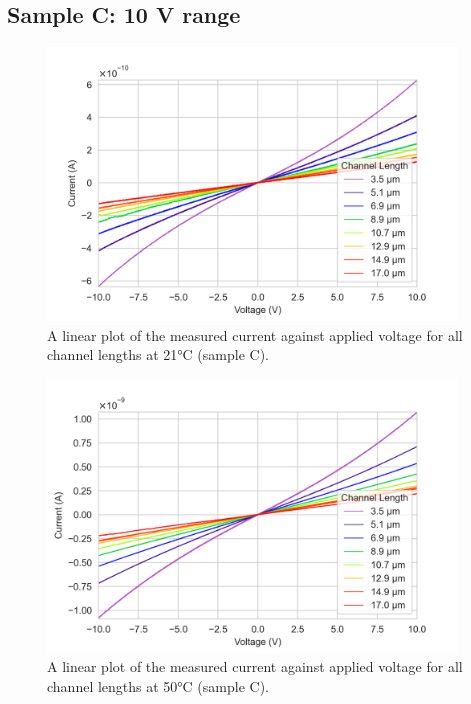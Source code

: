 \subsection{Sample C: 10 \si{\volt} range}
\label{app:I_V_sample_C}

\begin{figure}[h]
    \centering
    \includegraphics[width=0.97\textwidth]{Chapter6/Figs/Raster/Sample C 2019/IV/10V IV characteristics at 21 C.png}
    \caption{A linear plot of the measured current against applied voltage for all channel lengths at 21\si{\degreeCelsius} (sample C).}
    \label{appfig:C_current_voltage_21}
\end{figure}
\begin{figure}[h]
    \centering
    \includegraphics[width=0.97\textwidth]{Chapter6/Figs/Raster/Sample C 2019/IV/10V IV characteristics at 50 C.png}
    \caption{A linear plot of the measured current against applied voltage for all channel lengths at 50\si{\degreeCelsius} (sample C).}
    \label{appfig:C_current_voltage_50}
\end{figure}
